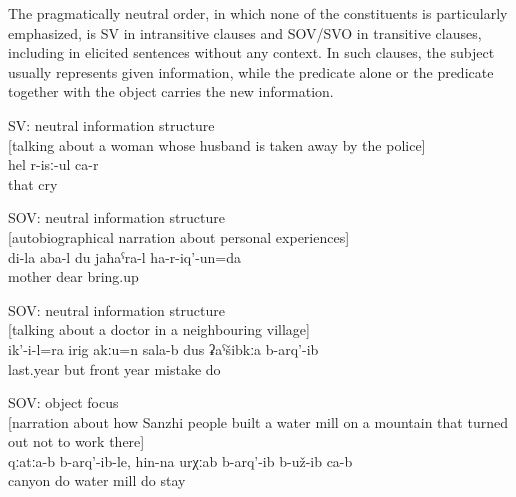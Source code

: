 The pragmatically neutral order, in which none of the constituents is particularly emphasized, is SV in intransitive clauses and SOV/SVO in transitive clauses, including in elicited sentences without any context. In such clauses, the subject usually represents given information, while the predicate alone or the predicate together with the object carries the new information.
%
\begin{exe}
	\ex	SV: neutral information structure\\\label{ex:She is crying SV}%
		[talking about a woman whose husband is taken away by the police]\\
	\gll	hel	r-isː-ul	ca-r\\
		that cry	\\
	\glt	{}

	\ex	SOV: neutral information structure\\	\label{ex:‎My mother protected me (kept me dear) SOV}
		[autobiographical narration about personal experiences]\\
	\gll	di-la	aba-l	du	jaħaˁra-l ha-r-iq'-un=da\\
			mother		dear	bring.up\\
	\glt	{}

	\ex	SOV: neutral information structure\\	\label{ex:But he also, not in the last year but two years ago, made a mistake SOV}
		[talking about a doctor in a neighbouring village]\\
	\gll	ik'-i-l=ra	irig	akːu=n	sala-b	dus	ʡaˁšibkːa	b-arq'-ib\\
			last.year	but	front	year	mistake	do\\
	\glt	{}

	\ex	SOV: object focus\\				\label{ex:(They) built it in the canyon, (they) apparently built a water mill SOV}
		[narration about how Sanzhi people built a water mill on a mountain that turned out not to work there]\\
	\gll	qːatːa-b	b-arq'-ib-le,	hin-na	urχːab	b-arq'-ib	b-už-ib	ca-b\\
		canyon	do	water	mill	do	stay \\
	\glt	{}


\end{exe}
